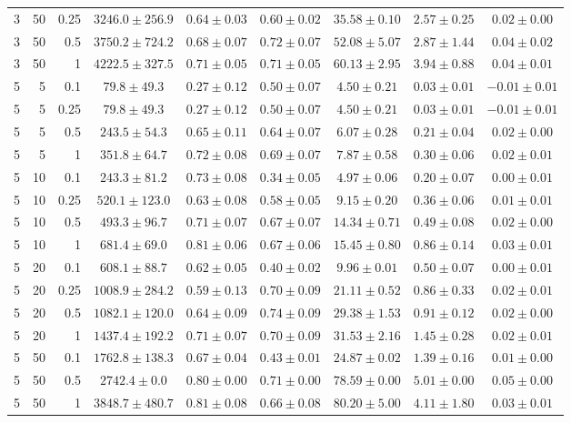 \begin{table}[htbp]
\begin{tabular}{@{}rrrcccccc@{}}
3 & 50 & 0.25 & $3246.0 \pm 256.9$ & $0.64 \pm 0.03$ & $0.60 \pm 0.02$ & $35.58 \pm 0.10$ & $2.57 \pm 0.25$ & $0.02 \pm 0.00$ \\
3 & 50 & 0.5 & $3750.2 \pm 724.2$ & $0.68 \pm 0.07$ & $0.72 \pm 0.07$ & $52.08 \pm 5.07$ & $2.87 \pm 1.44$ & $0.04 \pm 0.02$ \\
3 & 50 & 1 & $4222.5 \pm 327.5$ & $0.71 \pm 0.05$ & $0.71 \pm 0.05$ & $60.13 \pm 2.95$ & $3.94 \pm 0.88$ & $0.04 \pm 0.01$ \\
\midrule
5 & 5 & 0.1 & $79.8 \pm 49.3$ & $0.27 \pm 0.12$ & $0.50 \pm 0.07$ & $4.50 \pm 0.21$ & $0.03 \pm 0.01$ & $-0.01 \pm 0.01$ \\
5 & 5 & 0.25 & $79.8 \pm 49.3$ & $0.27 \pm 0.12$ & $0.50 \pm 0.07$ & $4.50 \pm 0.21$ & $0.03 \pm 0.01$ & $-0.01 \pm 0.01$ \\
5 & 5 & 0.5 & $243.5 \pm 54.3$ & $0.65 \pm 0.11$ & $0.64 \pm 0.07$ & $6.07 \pm 0.28$ & $0.21 \pm 0.04$ & $0.02 \pm 0.00$ \\
5 & 5 & 1 & $351.8 \pm 64.7$ & $0.72 \pm 0.08$ & $0.69 \pm 0.07$ & $7.87 \pm 0.58$ & $0.30 \pm 0.06$ & $0.02 \pm 0.01$ \\
5 & 10 & 0.1 & $243.3 \pm 81.2$ & $0.73 \pm 0.08$ & $0.34 \pm 0.05$ & $4.97 \pm 0.06$ & $0.20 \pm 0.07$ & $0.00 \pm 0.01$ \\
5 & 10 & 0.25 & $520.1 \pm 123.0$ & $0.63 \pm 0.08$ & $0.58 \pm 0.05$ & $9.15 \pm 0.20$ & $0.36 \pm 0.06$ & $0.01 \pm 0.01$ \\
5 & 10 & 0.5 & $493.3 \pm 96.7$ & $0.71 \pm 0.07$ & $0.67 \pm 0.07$ & $14.34 \pm 0.71$ & $0.49 \pm 0.08$ & $0.02 \pm 0.00$ \\
5 & 10 & 1 & $681.4 \pm 69.0$ & $0.81 \pm 0.06$ & $0.67 \pm 0.06$ & $15.45 \pm 0.80$ & $0.86 \pm 0.14$ & $0.03 \pm 0.01$ \\
5 & 20 & 0.1 & $608.1 \pm 88.7$ & $0.62 \pm 0.05$ & $0.40 \pm 0.02$ & $9.96 \pm 0.01$ & $0.50 \pm 0.07$ & $0.00 \pm 0.01$ \\
5 & 20 & 0.25 & $1008.9 \pm 284.2$ & $0.59 \pm 0.13$ & $0.70 \pm 0.09$ & $21.11 \pm 0.52$ & $0.86 \pm 0.33$ & $0.02 \pm 0.01$ \\
5 & 20 & 0.5 & $1082.1 \pm 120.0$ & $0.64 \pm 0.09$ & $0.74 \pm 0.09$ & $29.38 \pm 1.53$ & $0.91 \pm 0.12$ & $0.02 \pm 0.00$ \\
5 & 20 & 1 & $1437.4 \pm 192.2$ & $0.71 \pm 0.07$ & $0.70 \pm 0.09$ & $31.53 \pm 2.16$ & $1.45 \pm 0.28$ & $0.02 \pm 0.01$ \\
5 & 50 & 0.1 & $1762.8 \pm 138.3$ & $0.67 \pm 0.04$ & $0.43 \pm 0.01$ & $24.87 \pm 0.02$ & $1.39 \pm 0.16$ & $0.01 \pm 0.00$ \\
5 & 50 & 0.5 & $2742.4 \pm 0.0$ & $0.80 \pm 0.00$ & $0.71 \pm 0.00$ & $78.59 \pm 0.00$ & $5.01 \pm 0.00$ & $0.05 \pm 0.00$ \\
5 & 50 & 1 & $3848.7 \pm 480.7$ & $0.81 \pm 0.08$ & $0.66 \pm 0.08$ & $80.20 \pm 5.00$ & $4.11 \pm 1.80$ & $0.03 \pm 0.01$ \\
\bottomrule
\end{tabular}
\end{table}
